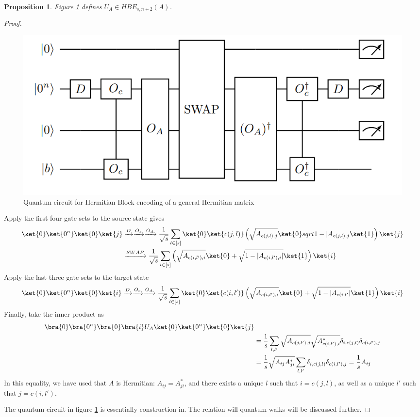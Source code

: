 \documentclass[12pt, oneside]{book}
\newtheorem{proposition}[theorem]{Proposition}
\theoremstyle{definition}
\theoremstyle{definition}
\theoremstyle{remark}
\begin{document}
\begin{proposition}
    Figure \ref{fig:hermitianblockencoding} defines $U_A\in HBE_{s,n+2}(A)$.
\end{proposition}
\begin{proof}
    \begin{figure}
        \centering
        \includegraphics[width=0.75\linewidth]{../images/hermitianblockencoding.png}
        \caption{Quantum circuit for Hermitian Block encoding of a general Hermitian matrix}
        \label{fig:hermitianblockencoding}
    \end{figure}
    Apply the first four gate sets to the source state gives
    \begin{align*}
    \ket{0}\ket{0^n}\ket{0}\ket{j}&\xrightarrow{D}\xrightarrow{O_c}\xrightarrow{O_A}\frac{1}{\sqrt{s}}\sum_{l\in[s]}\ket{0}\ket{c(j,l)}\left(\sqrt{A_{c(j,l),j}}\ket{0}sqrt{1-|A_{c(j,l),j}}\ket{1}\right)\ket{j}\\
    &\xrightarrow{SWAP}\frac{1}{\sqrt{s}}\sum_{l\in[s]}\left(\sqrt{A_{c(i,l'),i}}\ket{0}+\sqrt{1-|A_{c(i,l'),i}|}\ket{1}\right)\ket{i}
    \end{align*}
    Apply the last three gate sets to the target state
    \[
    \ket{0}\ket{0^n}\ket{0}\ket{i}\xrightarrow{D}\xrightarrow{O_c}\xrightarrow{O_A}\frac{1}{\sqrt{s}}\sum_{l\in[s]}\ket{0}\ket{c(i,l')}\left(\sqrt{A_{c(i,l'),i}}\ket{0}+\sqrt{1-|A_{c(i,l
    '}|}\ket{1}\right)\ket{i}
    \]
    Finally, take the inner product as
    \begin{align*}
    \bra{0}\bra{0^n}\bra{0}\bra{i}U_A\ket{0}\ket{0^n}\ket{0}\ket{j}& \\
    &=\frac{1}{s}\sum_{l,l'}\sqrt{A_{c(j,l'),j}}\sqrt{A^*_{c(i,l'),i}}\delta_{i,c(j,l)}\delta_{c(i,l'),j}\\
    &=\frac{1}{s}\sqrt{A_{ij}A^*_{ji}}\sum_{l,l'}\delta_{i,c(j,l)}\delta_{c(i,l'),j}=\frac{1}{s}A_{ij}
    \end{align*}
    In this equality, we have used that $A$ is Hermitian: $A_{ij}=A^*_{ji}$, and there exists a unique $l$ such that $i=c(j,l)$, as well as a unique $l'$ such that $j=c(i,l')$.

    The quantum circuit in figure \ref{fig:hermitianblockencoding} is essentially construction in. The relation will quantum walks will be discussed further.
    
\end{proof}
\end{document}
